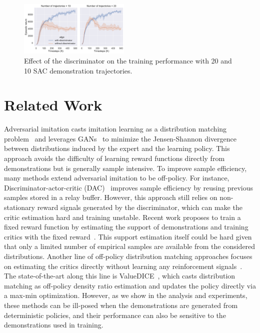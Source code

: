 \documentclass[letterpaper]{article} %
\begin{document}
\begin{figure}
\centering
\includegraphics[width=0.81\linewidth,height=1.035in ]{ablation.pdf}
\caption{Effect of the discriminator on the training performance with 20 and 10 SAC demonstration trajectories.}
\label{fig:ablation-discriminator}
\end{figure}


\vspace{-1.87mm}
\section{Related Work}
Adversarial imitation casts imitation learning as a distribution matching problem~\cite{ho2016generative} and leverages GANs~\cite{goodfellow2014generative} to minimize the Jensen-Shannon divergence between distributions induced by the expert and the learning policy.
This approach avoids the difficulty of learning reward functions directly from demonstrations but is generally sample intensive.
To improve sample efficiency, many methods extend adversarial imitation to be off-policy.
For instance, Discriminator-actor-critic (DAC)~\cite{kostrikov2018discriminator,sasaki2018sample} improves sample efficiency by reusing previous samples stored in a relay buffer.
However, this approach still relies on non-stationary reward signals generated by the discriminator, which can make the critic estimation hard and training unstable.
Recent work proposes to train a fixed reward function by estimating the support of demonstrations and training  critics with the fixed reward~\cite{wang2019random}.
This support estimation itself could be hard given that only a limited number of empirical samples are available from the considered distributions.
Another line of off-policy distribution matching approaches focuses on estimating the critics directly without learning any reinforcement signals~\cite{sasaki2018sample,kostrikov2019imitation}.
The state-of-the-art along this line is  ValueDICE~\cite{kostrikov2019imitation}, which casts distribution matching as off-policy density ratio estimation and updates the policy directly via a max-min optimization.
However, as we show in the analysis and experiments, these methods can be ill-posed when the demonstrations are generated from deterministic policies, and their performance can also be sensitive to the demonstrations used in training.
\end{document}
